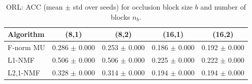 \begin{table}[t]
\centering
\caption{ORL: ACC (mean $\pm$ std over seeds) for occlusion block size $b$ and number of blocks $n_b$.}
\begin{tabular}{lcccc}
\toprule
Algorithm & (8,1) & (8,2) & (16,1) & (16,2) \\
\midrule
F-norm MU & 0.286 $\pm$ 0.000 & 0.253 $\pm$ 0.000 & 0.186 $\pm$ 0.000 & 0.192 $\pm$ 0.000 \\
L1-NMF & 0.506 $\pm$ 0.000 & 0.506 $\pm$ 0.000 & 0.225 $\pm$ 0.000 & 0.222 $\pm$ 0.000 \\
L2,1-NMF & 0.328 $\pm$ 0.000 & 0.314 $\pm$ 0.000 & 0.194 $\pm$ 0.000 & 0.194 $\pm$ 0.000 \\
\bottomrule
\end{tabular}
\end{table}
